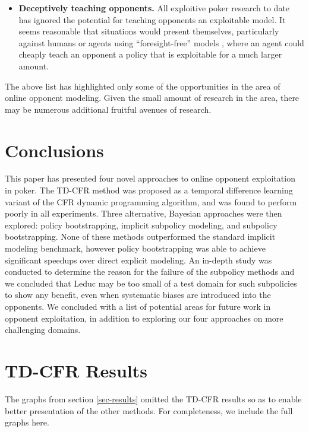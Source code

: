 \documentclass{aamas2013}
\begin{document}
\begin{itemize}
\item \textbf{Deceptively teaching opponents.} All exploitive poker research to date has ignored the potential for teaching opponents an exploitable model. It seems reasonable that situations would present themselves, particularly against humans or agents using ``foresight-free'' models \cite{simplemodels}, where an agent could cheaply teach an opponent a policy that is exploitable for a much larger amount.
\end{itemize}

The above list has highlighted only some of the opportunities in the area of online opponent modeling. Given the small amount of research in the area, there may be numerous additional fruitful avenues of research.

\section{Conclusions}
This paper has presented four novel approaches to online opponent exploitation in poker. The TD-CFR method was proposed as a temporal difference learning variant of the CFR dynamic programming algorithm, and was found to perform poorly in all experiments. Three alternative, Bayesian approaches were then explored: policy bootstrapping, implicit subpolicy modeling, and subpolicy bootstrapping. None of these methods outperformed the standard implicit modeling benchmark, however policy bootstrapping was able to achieve significant speedups over direct explicit modeling. An in-depth study was conducted to determine the reason for the failure of the subpolicy methods and we concluded that Leduc may be too small of a test domain for such subpolicies to show any benefit, even when systematic biases are introduced into the opponents. We concluded with a list of potential areas for future work in opponent exploitation, in addition to exploring our four approaches on more challenging domains.

%

%
%
\appendix

\section{TD-CFR Results}
The graphs from section \ref{sec-results} omitted the TD-CFR results so as to enable better presentation of the other methods. For completeness, we include the full graphs here.
\end{document}
